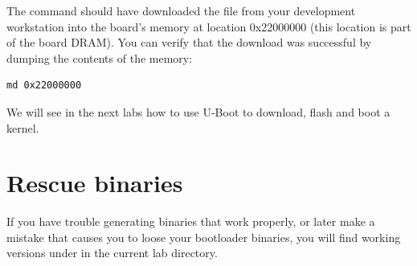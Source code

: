 The  command should have downloaded
the  file from your development
workstation into the board's memory at location 0x22000000 (this
location is part of the board DRAM). You can verify that the download
was successful by dumping the contents of the memory:

\begin{verbatim}
md 0x22000000
\end{verbatim}

We will see in the next labs how to use U-Boot to download, flash and
boot a kernel.

\section{Rescue binaries}

If you have trouble generating binaries that work properly, or later
make a mistake that causes you to loose your bootloader binaries, you
will find working versions under  in the current lab
directory.
